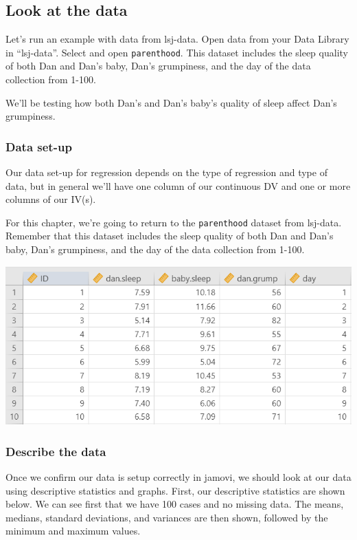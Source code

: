 \documentclass[
]{book}
\begin{document}
\hypertarget{look-at-the-data-9}{%
\subsection{Look at the data}\label{look-at-the-data-9}}

Let's run an example with data from lsj-data. Open data from your Data Library in ``lsj-data''. Select and open \texttt{parenthood}. This dataset includes the sleep quality of both Dan and Dan's baby, Dan's grumpiness, and the day of the data collection from 1-100.

We'll be testing how both Dan's and Dan's baby's quality of sleep affect Dan's grumpiness.

\hypertarget{data-set-up-9}{%
\subsubsection{Data set-up}\label{data-set-up-9}}

Our data set-up for regression depends on the type of regression and type of data, but in general we'll have one column of our continuous DV and one or more columns of our IV(s).

For this chapter, we're going to return to the \texttt{parenthood} dataset from lsj-data. Remember that this dataset includes the sleep quality of both Dan and Dan's baby, Dan's grumpiness, and the day of the data collection from 1-100.

\includegraphics{images/08-correlation/correlation-data.png}

\hypertarget{describe-the-data-7}{%
\subsubsection{Describe the data}\label{describe-the-data-7}}

Once we confirm our data is setup correctly in jamovi, we should look at our data using descriptive statistics and graphs. First, our descriptive statistics are shown below. We can see first that we have 100 cases and no missing data. The means, medians, standard deviations, and variances are then shown, followed by the minimum and maximum values.
\end{document}
